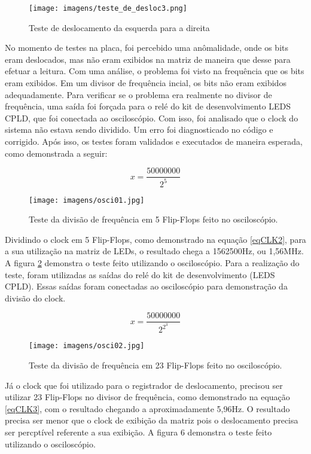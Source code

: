\begin{figure}[!h]
  \centering
    \texttt{[image: imagens/teste\_de\_desloc3.png]}
  \caption{Teste de deslocamento da esquerda para a direita}
  \label{fig:testedesloc3}
\end{figure}

No momento de testes na placa, foi percebido uma anômalidade, onde os bits eram deslocados, mas não eram exibidos na matriz de maneira que desse para efetuar a leitura. Com uma análise, o problema foi visto na frequência que os bits eram exibidos. Em um divisor de frequência incial, os bits não eram exibidos adequadamente. Para verificar se o problema era realmente no divisor de frequência, uma saída foi forçada para o relé do kit de desenvolvimento LEDS CPLD, que foi conectada ao osciloscópio. Com isso, foi analisado que o clock do sistema não estava sendo dividido. Um erro foi diagnosticado no código e corrigido. Após isso, os testes foram validados e executados de maneira esperada, como demonstrada a seguir:

\begin{equation} \label{eqCLK2}
    x=\frac{50000000}{2^5}
\end{equation}

\begin{figure}[!h]
    \centering
    \texttt{[image: imagens/osci01.jpg]}
    \caption{Teste da divisão de frequência em 5 Flip-Flops feito no osciloscópio.}
    \label{fig:osci5}
\end{figure}

Dividindo o clock em 5 Flip-Flops, como demonstrado na equação \ref{eqCLK2}, para a sua utilização na matriz de LEDs, o resultado chega a 1562500Hz, ou 1,56MHz. A figura \ref{fig:osci5} demonstra o teste feito utilizando o osciloscópio. Para a realização do teste, foram utilizadas as saídas do relé do kit de desenvolvimento (LEDS CPLD). Essas saídas foram conectadas ao osciloscópio para demonstração da divisão do clock.

\begin{equation} \label{eqCLK3}
    x=\frac{50000000}{2^2^3}
\end{equation}

\begin{figure}
    \centering
    \texttt{[image: imagens/osci02.jpg]}
    \caption{Teste da divisão de frequência em 23 Flip-Flops feito no osciloscópio.}
    \label{fig:osci23}
\end{figure}

Já o clock que foi utilizado para o registrador de deslocamento, precisou ser utilizar 23 Flip-Flops no divisor de frequência, como demonstrado na equação \ref{eqCLK3}, com o resultado chegando a aproximadamente 5,96Hz. O resultado precisa ser menor que o clock de exibição da matriz pois o deslocamento precisa ser percptível referente a sua exibição. A figura 6 demonstra o teste feito utilizando o osciloscópio.


